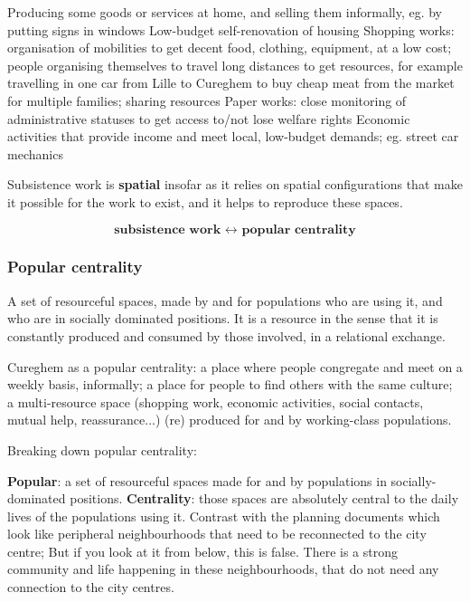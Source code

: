 \documentclass{article}
\begin{document}
\begin{outline}
	\1 Producing some goods or services at home, and selling them informally, eg. by putting signs in windows
	\1 Low-budget self-renovation of housing
	\1 Shopping works: organisation of mobilities to get decent food, clothing, equipment, at a low cost; people organising themselves to travel long distances to get resources, for example travelling in one car from Lille to Cureghem to buy cheap meat from the market for multiple families; sharing resources
	\1 Paper works: close monitoring of administrative statuses to get access to/not lose welfare rights
	\1 Economic activities that provide income and meet local, low-budget demands; eg. street car mechanics
\end{outline}

Subsistence work is \textbf{spatial} insofar as it relies on spatial configurations that make it possible for the work to exist, and it helps to reproduce these spaces.

\[\textbf{subsistence work $\leftrightarrow$ popular centrality}\]

\subsubsection{Popular centrality}

A set of resourceful spaces, made by and for populations who are using it, and who are in socially dominated positions. It is a resource in the sense that it is constantly produced and consumed by those involved, in a relational exchange.

Cureghem as a popular centrality: a place where people congregate and meet on a weekly basis, informally; a place for people to find others with the same culture; a multi-resource space (shopping work, economic activities, social contacts, mutual help, reassurance...) (re) produced for and by working-class populations.

Breaking down popular centrality:

\begin{outline}
	\1 \textbf{Popular}: a set of resourceful spaces made for and by populations in socially-dominated positions.
	\1 \textbf{Centrality}: those spaces are absolutely central to the daily lives of the populations using it. Contrast with the planning documents which look like peripheral neighbourhoods that need to be reconnected to the city centre; But if you look at it from below, this is false. There is a strong community and life happening in these neighbourhoods, that do not need any connection to the city centres.
\end{outline}
\end{document}
